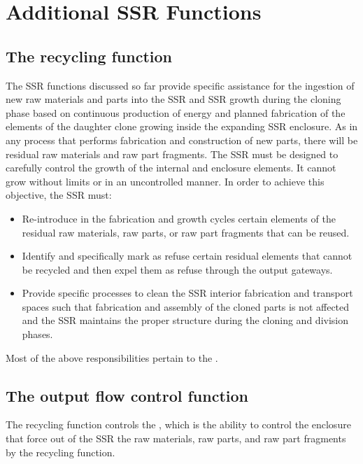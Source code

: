 \section{Additional SSR Functions}

\subsection[The recycling function]{The recycling function}

The SSR functions discussed so
far provide specific assistance for the ingestion of new raw
materials and parts into the SSR and SSR growth during the cloning phase
based on continuous production of energy and planned
fabrication of the elements of the daughter clone growing inside the
expanding SSR enclosure. As in any process that performs fabrication
and construction of new parts, there will be residual raw materials
and raw part fragments.  The SSR must be designed to carefully control
the growth of the internal and enclosure elements. It cannot
grow without limits or in an uncontrolled manner. In order to achieve
this objective, the SSR must:

\begin{itemize}
\item Re-introduce in the fabrication and growth cycles certain elements
of the residual raw materials, raw parts, or raw part fragments that
can be reused.
\item Identify and specifically mark as refuse certain residual elements
that cannot be recycled and then expel them as refuse through the
output gateways.
\item Provide specific processes to clean the SSR
interior fabrication and transport spaces such that fabrication and
assembly of the cloned parts is not affected and the SSR
maintains the proper structure during the cloning and division phases.
\end{itemize}

\noindent Most of the above responsibilities pertain to the .

\subsection[The output flow control function]{The output flow control
function}

The recycling function controls
the , which is the ability to
control the enclosure  that force out of the SSR
the raw materials, raw parts, and raw part fragments  
by the recycling function.

